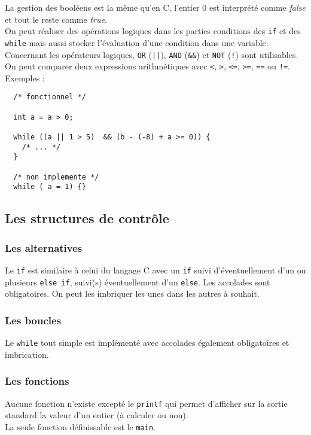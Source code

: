 La gestion des booléens est la même qu’en C, l'entier 0 est interprété comme \textit{false} et tout le reste comme \textit{true}.\\
On peut réaliser des opérations logiques dans les parties conditions des \texttt{if} et des \texttt{while} mais aussi stocker l'évaluation d'une condition dans une variable.\\
Concernant les opérateurs logiques, \texttt{OR} (\texttt{||}), \texttt{AND} (\texttt{\&\&}) et \texttt{NOT} (\texttt{!}) sont utilisables. On peut comparer deux expressions arithmétiques avec \texttt{<}, \texttt{>}, \texttt{<=}, \texttt{>=}, \texttt{==} ou \texttt{!=}.\\

Exemples :
\begin{verbatim}
  /* fonctionnel */
  
  int a = a > 0;
  
  while ((a || 1 > 5)  && (b - (-8) + a >= 0)) {
    /* ... */
  }

  /* non implemente */
  while ( a = 1) {}
\end{verbatim}

\subsection{Les structures de contrôle}

\subsubsection*{Les alternatives}

Le \texttt{if} est similaire à celui du langage C avec un \texttt{if} suivi d’éventuellement d'un ou plusieurs \texttt{else if}, suivi(s) éventuellement d’un \texttt{else}. Les accolades sont obligatoires. On peut les imbriquer les unes dans les autres à souhait.

\subsubsection*{Les boucles}

Le \texttt{while} tout simple est implémenté avec accolades également obligatoires et imbrication.

\subsubsection*{Les fonctions}

Aucune fonction n'existe excepté le \texttt{printf} qui permet d’afficher sur la sortie standard la valeur d’un entier (à calculer ou non).\\
La seule fonction définissable est le \texttt{main}.